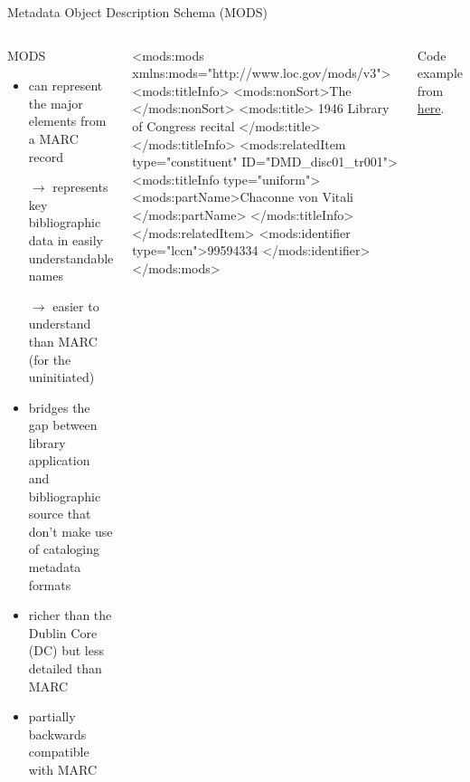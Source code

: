 \begin{frame}[fragile]{Metadata Object Description Schema (MODS)}
\begin{columns}
\begin{block}{MODS}\scriptsize
\begin{itemize}
\item can represent the major elements from a MARC record
\item[$\to$] represents key bibliographic data in easily understandable names
\item[$\to$] easier to understand than MARC (for the uninitiated)
\item bridges the gap between library application and bibliographic source that don't make use of cataloging metadata formats
\item richer than the Dublin Core (DC) but less detailed than MARC
\item partially backwards compatible with MARC
\end{itemize}
\end{block}
\begin{xmlcode}
<mods:mods xmlns:mods="http://www.loc.gov/mods/v3">    
  <mods:titleInfo>
    <mods:nonSort>The </mods:nonSort>
    <mods:title>
      1946 Library of Congress recital
    </mods:title>
  </mods:titleInfo>
  <mods:relatedItem type="constituent" 
                    ID="DMD_disc01_tr001">
    <mods:titleInfo type="uniform">
      <mods:partName>Chaconne von Vitali
        </mods:partName>
    </mods:titleInfo>
  </mods:relatedItem>
  <mods:identifier type="lccn">99594334
    </mods:identifier>
</mods:mods>
\end{xmlcode}
Code example from \href{http://www.digitalhumanities.org/dhq/vol/3/3/000064/000064.html}{here}.
\end{columns}
\end{frame}




